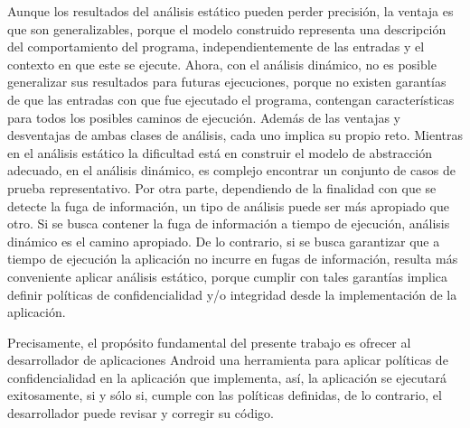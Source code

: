 Aunque los resultados del análisis estático pueden perder precisión, la ventaja
es que son generalizables, porque el modelo construido representa una
descripción del comportamiento del programa, independientemente de las entradas
y el contexto en que este se ejecute. Ahora, con el análisis dinámico, no es
posible generalizar sus resultados para futuras ejecuciones, porque no
existen garantías de que las entradas con que fue ejecutado el programa,
contengan características para todos los posibles caminos de ejecución.\newline 
Además de las ventajas y desventajas de ambas clases de análisis, cada uno
implica su propio reto. Mientras en el análisis estático la dificultad está
en construir el modelo de abstracción adecuado, en el análisis dinámico, es
complejo encontrar un conjunto de casos de prueba representativo.\newline
Por otra parte, dependiendo de la finalidad con que se detecte la fuga de
información, un tipo de análisis puede ser más apropiado que otro. Si se busca
contener la fuga de información a tiempo de ejecución, análisis dinámico es el
camino apropiado. 
De lo contrario, si se busca garantizar que a tiempo de
ejecución la aplicación no incurre en fugas de información, resulta más
conveniente aplicar análisis estático, porque cumplir con tales garantías
implica definir políticas de confidencialidad y/o integridad desde la
implementación de la
aplicación\cite{DD2460}\cite{information-flow-control}.\newline 


Precisamente, el propósito fundamental del presente trabajo es ofrecer al
desarrollador de aplicaciones Android una herramienta para aplicar políticas de
confidencialidad en la aplicación que implementa, así, la aplicación se
ejecutará exitosamente, si y sólo si, cumple con las políticas definidas, de lo
contrario, el desarrollador puede revisar y corregir su código.\newline
 
